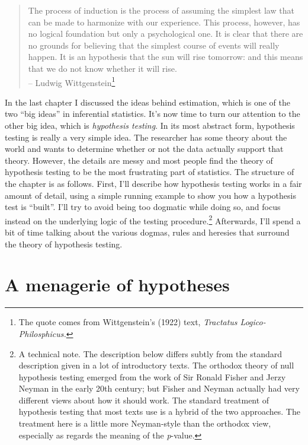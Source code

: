 \documentclass[
  a4paper,
]{book}
\begin{document}
\begin{quote}
The process of induction is the process of assuming the simplest law
that can be made to harmonize with our experience. This process,
however, has no logical foundation but only a psychological one. It is
clear that there are no grounds for believing that the simplest course
of events will really happen. It is an hypothesis that the sun will rise
tomorrow: and this means that we do not know whether it will rise.\\
-- Ludwig Wittgenstein\footnote{The quote comes from Wittgenstein's
  (1922) text, \emph{Tractatus Logico-Philosphicus.}}
\end{quote}

In the last chapter I discussed the ideas behind estimation, which is
one of the two ``big ideas'' in inferential statistics. It's now time to
turn our attention to the other big idea, which is \emph{hypothesis
testing}. In its most abstract form, hypothesis testing is really a very
simple idea. The researcher has some theory about the world and wants to
determine whether or not the data actually support that theory. However,
the details are messy and most people find the theory of hypothesis
testing to be the most frustrating part of statistics. The structure of
the chapter is as follows. First, I'll describe how hypothesis testing
works in a fair amount of detail, using a simple running example to show
you how a hypothesis test is ``built''. I'll try to avoid being too
dogmatic while doing so, and focus instead on the underlying logic of
the testing procedure.\footnote{A technical note. The description below
  differs subtly from the standard description given in a lot of
  introductory texts. The orthodox theory of null hypothesis testing
  emerged from the work of Sir Ronald Fisher and Jerzy Neyman in the
  early 20th century; but Fisher and Neyman actually had very different
  views about how it should work. The standard treatment of hypothesis
  testing that most texts use is a hybrid of the two approaches. The
  treatment here is a little more Neyman-style than the orthodox view,
  especially as regards the meaning of the \emph{p}-value.} Afterwards,
I'll spend a bit of time talking about the various dogmas, rules and
heresies that surround the theory of hypothesis testing.

\hypertarget{a-menagerie-of-hypotheses}{%
\section{A menagerie of hypotheses}\label{a-menagerie-of-hypotheses}}
\end{document}
